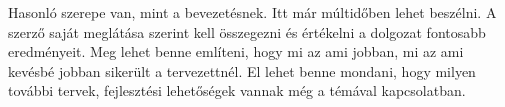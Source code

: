 
Hasonló szerepe van, mint a bevezetésnek.
Itt már múltidőben lehet beszélni.
A szerző saját meglátása szerint kell összegezni és értékelni a dolgozat fontosabb eredményeit.
Meg lehet benne említeni, hogy mi az ami jobban, mi az ami kevésbé jobban sikerült a tervezettnél.
El lehet benne mondani, hogy milyen további tervek, fejlesztési lehetőségek vannak még a témával kapcsolatban.

